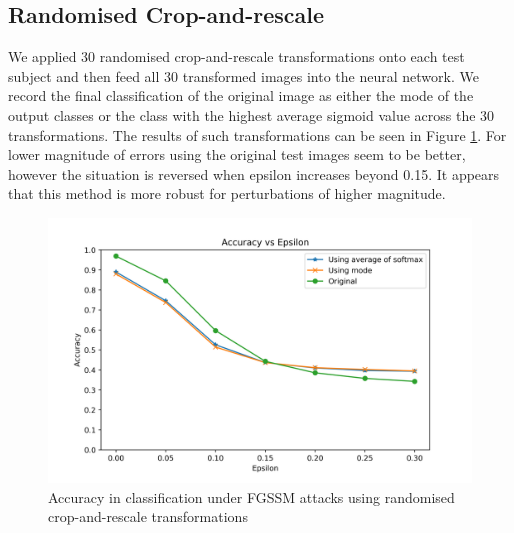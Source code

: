 \subsection{Randomised Crop-and-rescale}

We applied 30 randomised crop-and-rescale transformations onto each test subject and then feed all 30 transformed images into the neural network. We record the final classification of the original image as either the mode of the output classes or the class with the highest average sigmoid value across the 30 transformations. The results of such transformations can be seen in Figure \ref{fig:rand}. For lower magnitude of errors using the original test images seem to be better, however the situation is reversed when epsilon increases beyond 0.15. It appears that this method is more robust for perturbations of higher magnitude.

\begin{figure}[h!]
        \includegraphics[width=\textwidth]{sgd_random}
		\caption{Accuracy in classification under FGSSM attacks using randomised crop-and-rescale transformations}
		\label{fig:rand}
\end{figure}

